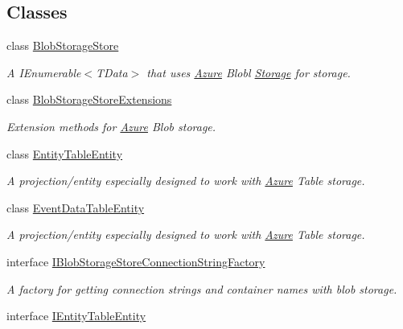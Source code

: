 \subsection*{Classes}
\begin{DoxyCompactItemize}
\item 
class \hyperlink{classCqrs_1_1Azure_1_1BlobStorage_1_1BlobStorageStore}{Blob\+Storage\+Store}
\begin{DoxyCompactList}\small\item\em A I\+Enumerable$<$\+T\+Data$>$ that uses \hyperlink{namespaceCqrs_1_1Azure}{Azure} Blobl \hyperlink{namespaceCqrs_1_1Azure_1_1Storage}{Storage} for storage. \end{DoxyCompactList}\item 
class \hyperlink{classCqrs_1_1Azure_1_1BlobStorage_1_1BlobStorageStoreExtensions}{Blob\+Storage\+Store\+Extensions}
\begin{DoxyCompactList}\small\item\em Extension methods for \hyperlink{namespaceCqrs_1_1Azure}{Azure} Blob storage. \end{DoxyCompactList}\item 
class \hyperlink{classCqrs_1_1Azure_1_1BlobStorage_1_1EntityTableEntity}{Entity\+Table\+Entity}
\begin{DoxyCompactList}\small\item\em A projection/entity especially designed to work with \hyperlink{namespaceCqrs_1_1Azure}{Azure} Table storage. \end{DoxyCompactList}\item 
class \hyperlink{classCqrs_1_1Azure_1_1BlobStorage_1_1EventDataTableEntity}{Event\+Data\+Table\+Entity}
\begin{DoxyCompactList}\small\item\em A projection/entity especially designed to work with \hyperlink{namespaceCqrs_1_1Azure}{Azure} Table storage. \end{DoxyCompactList}\item 
interface \hyperlink{interfaceCqrs_1_1Azure_1_1BlobStorage_1_1IBlobStorageStoreConnectionStringFactory}{I\+Blob\+Storage\+Store\+Connection\+String\+Factory}
\begin{DoxyCompactList}\small\item\em A factory for getting connection strings and container names with blob storage. \end{DoxyCompactList}\item 
interface \hyperlink{interfaceCqrs_1_1Azure_1_1BlobStorage_1_1IEntityTableEntity}{I\+Entity\+Table\+Entity}

\end{DoxyCompactItemize}
